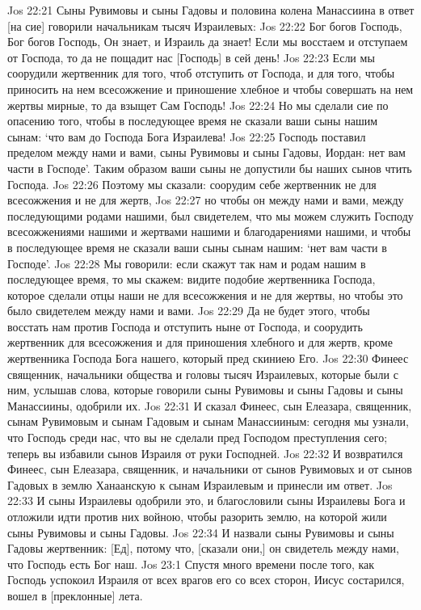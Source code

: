 Jos 22:21  Сыны Рувимовы и сыны Гадовы и половина колена Манассиина в ответ [на сие] говорили начальникам тысяч Израилевых:
Jos 22:22  Бог богов Господь, Бог богов Господь, Он знает, и Израиль да знает! Если мы восстаем и отступаем от Господа, то да не пощадит нас [Господь] в сей день!
Jos 22:23  Если мы соорудили жертвенник для того, чтоб отступить от Господа, и для того, чтобы приносить на нем всесожжение и приношение хлебное и чтобы совершать на нем жертвы мирные, то да взыщет Сам Господь!
Jos 22:24  Но мы сделали сие по опасению того, чтобы в последующее время не сказали ваши сыны нашим сынам: `что вам до Господа Бога Израилева!
Jos 22:25  Господь поставил пределом между нами и вами, сыны Рувимовы и сыны Гадовы, Иордан: нет вам части в Господе'. Таким образом ваши сыны не допустили бы наших сынов чтить Господа.
Jos 22:26  Поэтому мы сказали: соорудим себе жертвенник не для всесожжения и не для жертв,
Jos 22:27  но чтобы он между нами и вами, между последующими родами нашими, был свидетелем, что мы можем служить Господу всесожжениями нашими и жертвами нашими и благодарениями нашими, и чтобы в последующее время не сказали ваши сыны сынам нашим: `нет вам части в Господе'.
Jos 22:28  Мы говорили: если скажут так нам и родам нашим в последующее время, то мы скажем: видите подобие жертвенника Господа, которое сделали отцы наши не для всесожжения и не для жертвы, но чтобы это было свидетелем между нами и вами.
Jos 22:29  Да не будет этого, чтобы восстать нам против Господа и отступить ныне от Господа, и соорудить жертвенник для всесожжения и для приношения хлебного и для жертв, кроме жертвенника Господа Бога нашего, который пред скиниею Его.
Jos 22:30  Финеес священник, начальники общества и головы тысяч Израилевых, которые были с ним, услышав слова, которые говорили сыны Рувимовы и сыны Гадовы и сыны Манассиины, одобрили их.
Jos 22:31  И сказал Финеес, сын Елеазара, священник, сынам Рувимовым и сынам Гадовым и сынам Манассииным: сегодня мы узнали, что Господь среди нас, что вы не сделали пред Господом преступления сего; теперь вы избавили сынов Израиля от руки Господней.
Jos 22:32  И возвратился Финеес, сын Елеазара, священник, и начальники от сынов Рувимовых и от сынов Гадовых в землю Ханаанскую к сынам Израилевым и принесли им ответ.
Jos 22:33  И сыны Израилевы одобрили это, и благословили сыны Израилевы Бога и отложили идти против них войною, чтобы разорить землю, на которой жили сыны Рувимовы и сыны Гадовы.
Jos 22:34  И назвали сыны Рувимовы и сыны Гадовы жертвенник: [Ед], потому что, [сказали они,] он свидетель между нами, что Господь есть Бог наш.
Jos 23:1  Спустя много времени после того, как Господь успокоил Израиля от всех врагов его со всех сторон, Иисус состарился, вошел в [преклонные] лета.
